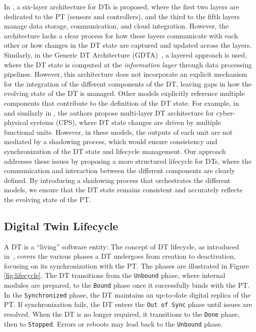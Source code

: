 In \cite{Redelinghuys2019}, a six-layer architecture for \acp{DT} is proposed, where the first two layers are dedicated to the \ac{PT} (sensors and controllers), and the third to the fifth layers manage data storage, communication, and cloud integration. However, the architecture lacks a clear process for how these layers communicate with each other or how changes in the \ac{DT} state are captured and updated across the layers. Similarly, in the Generic \ac{DT} Architecture (GDTA)~\cite{app10248903}, a layered approach is used, where the \ac{DT} state is computed at the \emph{information layer} through data processing pipelines. However, this architecture does not incorporate an explicit mechanism for the integration of the different components of the \ac{DT}, leaving gaps in how the evolving state of the \ac{DT} is managed. Other models explicitly reference multiple components that contribute to the definition of the \ac{DT} state. For example, in \cite{alam2017access} and similarly in \cite{Malakuti2019fourlayer}, the authors propose multi-layer \ac{DT} architecture for cyber-physical systems (CPS), where \ac{DT} state changes are driven by multiple functional units. However, in these models, the outputs of each unit are not mediated by a shadowing process, which would ensure consistency and synchronization of the \ac{DT} state and lifecycle management. Our approach addresses these issues by proposing a more structured lifecycle for \acp{DT}, where the communication and interaction between the different components are clearly defined. By introducing a shadowing process that orchestrates the different models, we ensure that the \ac{DT} state remains consistent and accurately reflects the evolving state of the \ac{PT}.


\subsection{Digital Twin Lifecycle}

A \ac{DT} is a ``living'' software entity:
The concept of \ac{DT} lifecycle, as introduced in~\cite{web-of-dt-ricci-2022}, covers the various phases a \ac{DT} undergoes from creation to deactivation, focusing on its synchronization with the \ac{PT}.
The phases are illustrated in Figure \ref{fig:lifecycle}.
The \ac{DT} transitions from the \texttt{Unbound} phase, where internal modules are prepared, to the \texttt{Bound} phase once it successfully binds with the \ac{PT}.
In the \texttt{Synchronized} phase, the \ac{DT} maintains an up-to-date digital replica of the \ac{PT}.
If synchronization fails, the \ac{DT} enters the \texttt{Out of Sync} phase until issues are resolved.
When the \ac{DT} is no longer required, it transitions to the \texttt{Done} phase, then to \texttt{Stopped}.
Errors or reboots may lead back to the \texttt{Unbound} phase.

